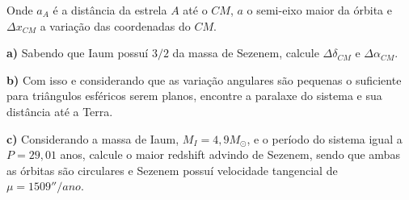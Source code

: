 \documentclass[11pt]{article}
\begin{document}
\begin{pproblem}
    Onde \(a_A\) é a distância da estrela \(A\) até o \(CM\), \(a\) o semi-eixo maior da órbita e \(\Delta x_{CM}\) a variação das coordenadas do \(CM\). 
    
    \textbf{a)} Sabendo que Iaum possuí \(3/2\) da massa de Sezenem, calcule \(\Delta\delta_{CM}\) e \(\Delta\alpha_{CM}\).
    
    \textbf{b)} Com isso e considerando que as variação angulares são pequenas o suficiente para triângulos esféricos serem planos, encontre a paralaxe do sistema e sua distância até a Terra.

    \textbf{c)} Considerando a massa de Iaum, \(M_I = 4,9 M_\odot\), e o período do sistema igual a \(P = 29,01\) anos, calcule o maior redshift advindo de Sezenem, sendo que ambas as órbitas são circulares e Sezenem possuí velocidade tangencial de \(\mu = 1509''/ano\).

\end{pproblem}
\end{document}
